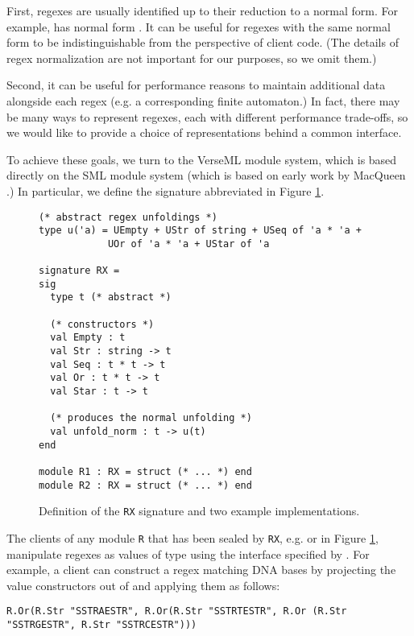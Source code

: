 First, regexes are usually identified up to their reduction to a normal form. For example,  has normal form . It can be useful for regexes with the same normal form to be  indistinguishable from the perspective of client code. (The details of regex normalization are not important for our purposes, so we omit them.)

Second, it can be useful for performance reasons to maintain additional data alongside each regex (e.g. a corresponding finite automaton.) In fact, there may be many ways to represent regexes, each with different performance trade-offs, so we would like to provide a choice of representations behind a common interface.

To achieve these goals, we turn to the VerseML module system, which is based directly on the SML module system (which is based on early work by MacQueen \cite{MacQueen:1984:MSM:800055.802036}.) In particular, we define the {signature} abbreviated  in Figure \ref{fig:signature-RX}.

\begin{figure}[ht]
\begin{lstlisting}[deletekeywords={case}]
(* abstract regex unfoldings *)
type u('a) = UEmpty + UStr of string + USeq of 'a * 'a + 
            UOr of 'a * 'a + UStar of 'a

signature RX = 
sig
  type t (* abstract *)

  (* constructors *)
  val Empty : t
  val Str : string -> t
  val Seq : t * t -> t
  val Or : t * t -> t
  val Star : t -> t

  (* produces the normal unfolding *)
  val unfold_norm : t -> u(t)
end

module R1 : RX = struct (* ... *) end
module R2 : RX = struct (* ... *) end
\end{lstlisting}
\vspace{-5px}
\caption{Definition of the \lstinline{RX} signature and two example implementations.}
\label{fig:signature-RX}
\end{figure}

The clients of any module \lstinline{R} that has been sealed by \lstinline{RX}, e.g.  or   in Figure \ref{fig:signature-RX}, manipulate regexes as values of type  using the interface specified by . For example, a client can construct a regex matching DNA bases by projecting the value constructors out of  and applying them as follows:
\begin{lstlisting}[numbers=none]
R.Or(R.Str "SSTRAESTR", R.Or(R.Str "SSTRTESTR", R.Or (R.Str "SSTRGESTR", R.Str "SSTRCESTR")))
\end{lstlisting}

